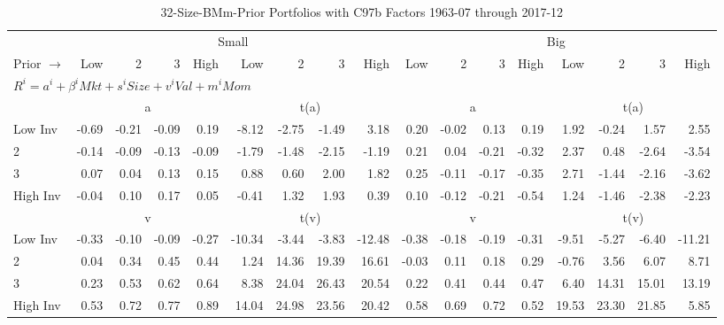 
\begin{table}[!ht]
\footnotesize
\centering
\caption{32-Size-BMm-Prior Portfolios with C97b Factors 1963-07 through 2017-12}
\begin{tabular}{lrrrrrrrrrrrrrrrr}
  \toprule
    & \multicolumn{8}{c}{Small} & \multicolumn{8}{c}{Big} \\
      \cmidrule(r){2-9} \cmidrule(r){10-17}
    Prior $\rightarrow$ & Low & 2 & 3 & High & Low & 2 & 3 & High & Low & 2 & 3 & High & Low & 2 & 3 & High \\ 
  \midrule
  \multicolumn{17}{l}{$R^i=a^i+\beta^iMkt+s^iSize+v^iVal+m^iMom$} \\

  
    
      & \multicolumn{4}{c}{a} & \multicolumn{4}{c}{t(a)}
    
      & \multicolumn{4}{c}{a} & \multicolumn{4}{c}{t(a)}
    
    \\
      \cmidrule(r){2-5} \cmidrule(r){6-9} \cmidrule(r){10-13} \cmidrule(r){14-17}

    Low Inv   & -0.69  & -0.21  & -0.09  & 0.19  & -8.12  & -2.75  & -1.49  & 3.18  & 0.20  & -0.02  & 0.13  & 0.19  & 1.92  & -0.24  & 1.57  & 2.55  \\
           2  & -0.14  & -0.09  & -0.13  & -0.09  & -1.79  & -1.48  & -2.15  & -1.19  & 0.21  & 0.04  & -0.21  & -0.32  & 2.37  & 0.48  & -2.64  & -3.54  \\
           3  & 0.07  & 0.04  & 0.13  & 0.15  & 0.88  & 0.60  & 2.00  & 1.82  & 0.25  & -0.11  & -0.17  & -0.35  & 2.71  & -1.44  & -2.16  & -3.62  \\
    High Inv  & -0.04  & 0.10  & 0.17  & 0.05  & -0.41  & 1.32  & 1.93  & 0.39  & 0.10  & -0.12  & -0.21  & -0.54  & 1.24  & -1.46  & -2.38  & -2.23  \\

  
    
      & \multicolumn{4}{c}{v} & \multicolumn{4}{c}{t(v)}
    
      & \multicolumn{4}{c}{v} & \multicolumn{4}{c}{t(v)}
    
    \\
      \cmidrule(r){2-5} \cmidrule(r){6-9} \cmidrule(r){10-13} \cmidrule(r){14-17}

    Low Inv   & -0.33  & -0.10  & -0.09  & -0.27  & -10.34  & -3.44  & -3.83  & -12.48  & -0.38  & -0.18  & -0.19  & -0.31  & -9.51  & -5.27  & -6.40  & -11.21  \\
           2  & 0.04  & 0.34  & 0.45  & 0.44  & 1.24  & 14.36  & 19.39  & 16.61  & -0.03  & 0.11  & 0.18  & 0.29  & -0.76  & 3.56  & 6.07  & 8.71  \\
           3  & 0.23  & 0.53  & 0.62  & 0.64  & 8.38  & 24.04  & 26.43  & 20.54  & 0.22  & 0.41  & 0.44  & 0.47  & 6.40  & 14.31  & 15.01  & 13.19  \\
    High Inv  & 0.53  & 0.72  & 0.77  & 0.89  & 14.04  & 24.98  & 23.56  & 20.42  & 0.58  & 0.69  & 0.72  & 0.52  & 19.53  & 23.30  & 21.85  & 5.85  \\


\end{tabular}
\end{table}
